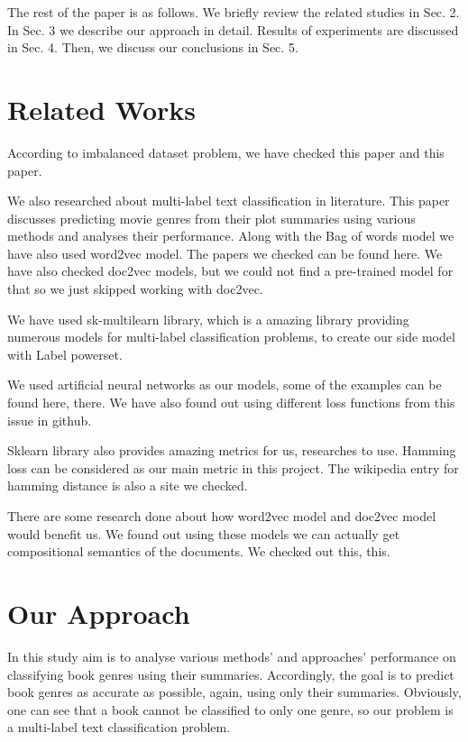 \documentclass[10pt,twocolumn,letterpaper]{article}
\begin{document}
The rest of the paper is as follows. We briefly review the related studies in Sec. 2. In Sec. 3 we describe our approach in detail. Results of experiments are discussed in Sec. 4. Then, we discuss our conclusions in Sec. 5.

\section{Related Works}
According to imbalanced dataset problem, we have checked this paper\cite{Imb} and this paper\cite{Imb2}.

We also researched about multi-label text classification in literature. This paper\cite{movie} discusses predicting movie genres from their plot summaries using various methods and analyses their performance. Along with the Bag of words model we have also used word2vec model. The papers we checked can be found here\cite{DBLP:journals/corr/abs-1301-3781}. We have also checked doc2vec\cite{doc2vec} models, but we could not find a pre-trained model for that so we just skipped working with doc2vec.

We have used sk-multilearn\cite{2017arXiv170201460S} library, which is a amazing library providing numerous models for multi-label classification problems, to create our side model with Label powerset. 

We used artificial neural networks as our models, some of the examples can be found here\cite{annml1}, there\cite{annml3}. We have also found out using different loss functions from this issue in github\cite{annml2}.

Sklearn library\cite{scikit-learn}\cite{sklearn_api} also provides amazing metrics for us, researches to use. Hamming\cite{hammingloss} loss can be considered as our main metric in this project. The wikipedia entry\cite{hammingdistance} for hamming distance is also a site we checked.

There are some research done about how word2vec model and doc2vec model would benefit us. We found out using these models we can actually get compositional semantics of the documents. We checked out this\cite{comp1}, this\cite{comp2}.

\section{Our Approach}
In this study aim is to analyse various methods' and approaches' performance on classifying book genres using their summaries. Accordingly, the goal is to predict book genres as accurate as possible, again, using only their summaries. Obviously, one can see that a book cannot be classified to only one genre, so our problem is a multi-label text classification problem. 
\end{document}
